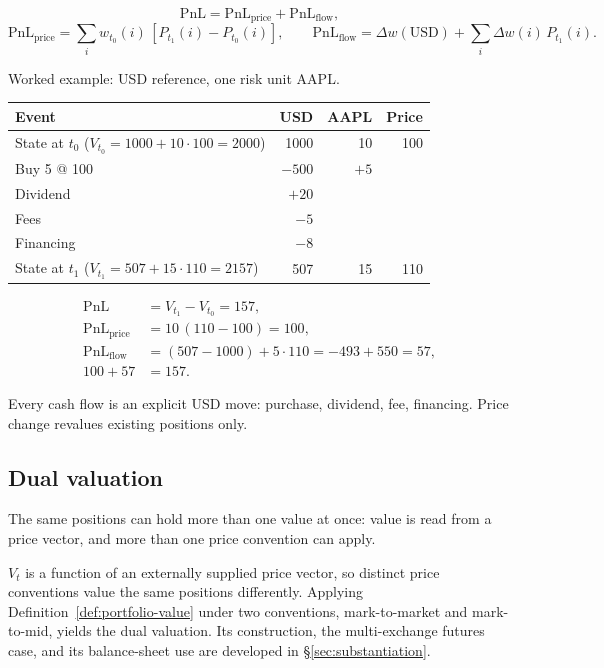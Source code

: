\begin{proposition}
\label{prop:pnl-attribution}
\[
\mathrm{PnL} = \mathrm{PnL}_{\text{price}} + \mathrm{PnL}_{\text{flow}},
\]
\[
\mathrm{PnL}_{\text{price}} = \sum_i w_{t_0}(i)\,[P_{t_1}(i) - P_{t_0}(i)],
\qquad
\mathrm{PnL}_{\text{flow}} = \Delta w(\mathrm{USD}) + \sum_i \Delta w(i)\,P_{t_1}(i).
\]
\end{proposition}

\noindent Worked example: USD reference, one risk unit AAPL.

\begin{center}
\begin{tabular}{l r r r}
\toprule
\textbf{Event} & \textbf{USD} & \textbf{AAPL} & \textbf{Price} \\
\midrule
State at $t_0$ \quad ($V_{t_0}=1000+10\cdot100=2000$) & 1000 & 10 & 100 \\
\midrule
Buy 5 @ 100 & $-500$ & $+5$ & \\
Dividend & $+20$ & & \\
Fees & $-5$ & & \\
Financing & $-8$ & & \\
\midrule
State at $t_1$ \quad ($V_{t_1}=507+15\cdot110=2157$) & 507 & 15 & 110 \\
\bottomrule
\end{tabular}
\end{center}

\begin{align*}
\mathrm{PnL} &= V_{t_1} - V_{t_0} = 157, \\
\mathrm{PnL}_{\text{price}} &= 10\,(110-100) = 100, \\
\mathrm{PnL}_{\text{flow}} &= (507-1000) + 5\cdot110 = -493 + 550 = 57, \\
100 + 57 &= 157.
\end{align*}

\noindent Every cash flow is an explicit USD move: purchase, dividend, fee, financing. Price change revalues existing positions only.

\subsection{Dual valuation}

\noindent The same positions can hold more than one value at once: value is read from a price vector, and more than one price convention can apply.

\medskip
$V_t$ is a function of an externally supplied price vector, so distinct price conventions value the same positions differently. Applying Definition~\ref{def:portfolio-value} under two conventions, mark-to-market and mark-to-mid, yields the dual valuation. Its construction, the multi-exchange futures case, and its balance-sheet use are developed in \S\ref{sec:substantiation}.

